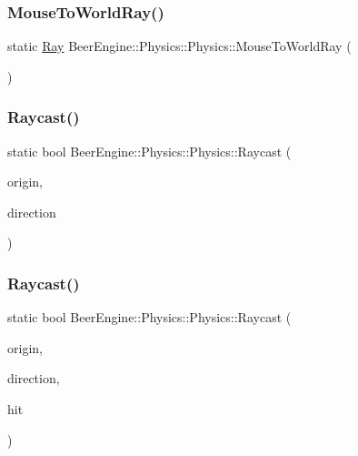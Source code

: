 \subsubsection{\texorpdfstring{Mouse\+To\+World\+Ray()}{MouseToWorldRay()}}
{\footnotesize\ttfamily static \mbox{\hyperlink{struct_beer_engine_1_1_physics_1_1_ray}{Ray}} Beer\+Engine\+::\+Physics\+::\+Physics\+::\+Mouse\+To\+World\+Ray (\begin{DoxyParamCaption}{ }\end{DoxyParamCaption})\hspace{0.3cm}{\ttfamily [static]}}

\mbox{\label{class_beer_engine_1_1_physics_1_1_physics_a75ad2de8af72e4e5309c5c47bdfd6a02}} 
\subsubsection{\texorpdfstring{Raycast()}{Raycast()}\hspace{0.1cm}{\footnotesize\ttfamily [1/3]}}
{\footnotesize\ttfamily static bool Beer\+Engine\+::\+Physics\+::\+Physics\+::\+Raycast (\begin{DoxyParamCaption}\item[{glm\+::vec3}]{origin,  }\item[{glm\+::vec3}]{direction }\end{DoxyParamCaption})\hspace{0.3cm}{\ttfamily [static]}}

\mbox{\label{class_beer_engine_1_1_physics_1_1_physics_a427c654b718bb4948648d55a80934c33}} 
\subsubsection{\texorpdfstring{Raycast()}{Raycast()}\hspace{0.1cm}{\footnotesize\ttfamily [2/3]}}
{\footnotesize\ttfamily static bool Beer\+Engine\+::\+Physics\+::\+Physics\+::\+Raycast (\begin{DoxyParamCaption}\item[{glm\+::vec3}]{origin,  }\item[{glm\+::vec3}]{direction,  }\item[{\mbox{\hyperlink{struct_beer_engine_1_1_physics_1_1_raycast_hit}{Raycast\+Hit}} \&}]{hit }\end{DoxyParamCaption})\hspace{0.3cm}{\ttfamily [static]}}

